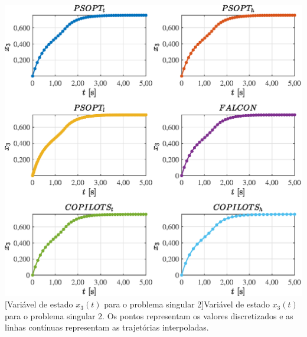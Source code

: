 \noindent
\begin{minipage}{\textwidth}
	\vspace{\onelineskip}
	\centering
	\includegraphics[scale=0.70]{fig/resultados/singular2/traj/x/x_3}
	[Variável de estado $x_3(t)$ para o problema singular 2]{Variável de estado $x_3(t)$ para o problema singular 2. Os pontos representam os valores discretizados e as linhas contínuas representam as trajetórias interpoladas.}
	\label{fig:singular2:x:x3}
	\vspace{\onelineskip}
\end{minipage}

